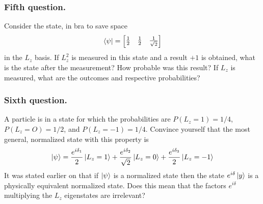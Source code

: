 \documentclass[../../../main.tex]{subfiles}
\begin{document}
\subsubsection{Fifth question.}
Consider the state, in bra to save space 
\begin{equation*}
    \bra{\psi}=\begin{bmatrix}
        \frac{1 }{2}&\frac{1 }{2}&\frac{1 }{\sqrt{2}}
    \end{bmatrix}
\end{equation*}
in the $L_z$ basis.
If $L_z^2$ is measured in this state and a result $+1$ is obtained, what is the state after the measurement? 
How probable was this result? 
If $L_z$ is measured, what are the outcomes and respective probabilities?

\subsubsection{Sixth question.}
A particle is in a state for which the probabilities are $P(L_z=1)=1/4$, $P(L_z=O)=1/2$, and $P(L_z =-1)= 1 /4$. 
Convince yourself that the most general, normalized state with this property is
\begin{equation*}
    \ket{\psi}=\frac{e^{i\delta_1 }}{2 }\ket{L_z=1}+\frac{e^{i \delta_2 }}{\sqrt{2 }}\ket{L_z=0}+\frac{e^{i \delta_3 }}{2}\ket{L_z=-1}
\end{equation*}
It was stated earlier on that if $\ket{\psi}$ is a normalized state then the state $e^{i\delta}\ket{y}$ is a physically equivalent normalized state. 
Does this mean that the factors $e^{i\delta}$ multiplying the $L_z$ eigenstates are irrelevant?
\end{document}
